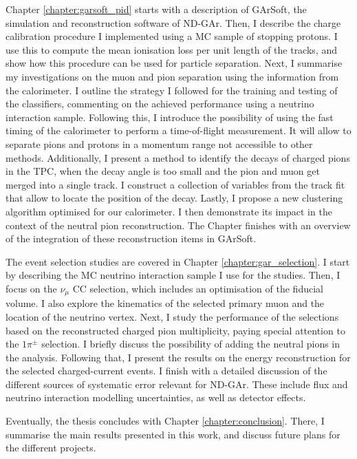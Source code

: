 Chapter \ref{chapter:garsoft_pid} starts with a description of GArSoft, the simulation and reconstruction software of ND-GAr. Then, I describe the charge calibration procedure I implemented using a MC sample of stopping protons. I use this to compute the mean ionisation loss per unit length of the tracks, and show how this procedure can be used for particle separation. Next, I summarise my investigations on the muon and pion separation using the information from the calorimeter. I outline the strategy I followed for the training and testing of the classifiers, commenting on the achieved performance using a neutrino interaction sample. Following this, I introduce the possibility of using the fast timing of the calorimeter to perform a time-of-flight measurement. It will allow to separate pions and protons in a momentum range not accessible to other methods. Additionally, I present a method to identify the decays of charged pions in the TPC, when the decay angle is too small and the pion and muon get merged into a single track. I construct a collection of variables from the track fit that allow to locate the position of the decay. Lastly, I propose a new clustering algorithm optimised for our calorimeter. I then demonstrate its impact in the context of the neutral pion reconstruction. The Chapter finishes with an overview of the integration of these reconstruction items in GArSoft.

The event selection studies are covered in Chapter \ref{chapter:gar_selection}. I start by describing the MC neutrino interaction sample I use for the studies. Then, I focus on the $\nu_{\mu}$ CC selection, which includes an optimisation of the fiducial volume. I also explore the kinematics of the selected primary muon and the location of the neutrino vertex. Next, I study the performance of the selections based on the reconstructed charged pion multiplicity, paying special attention to the $1\pi^{\pm}$ selection. I briefly discuss the possibility of adding the neutral pions in the analysis. Following that, I present the results on the energy reconstruction for the selected charged-current events. I finish with a detailed discussion of the different sources of systematic error relevant for ND-GAr. These include flux and neutrino interaction modelling uncertainties, as well as detector effects.

Eventually, the thesis concludes with Chapter \ref{chapter:conclusion}. There, I summarise the main results presented in this work, and discuss future plans for the different projects.